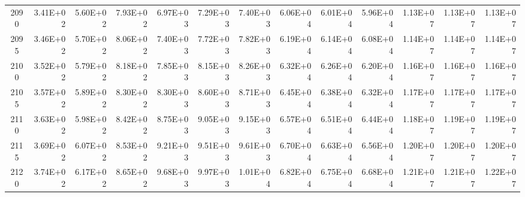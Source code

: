 \documentclass{article}
\begin{document}
\begin{table}
\begin{tabular}{crrr|rrr|rrr|rrr}
2090     & 3.41E+02 & 5.60E+02 & 7.93E+02 & 6.97E+03 & 7.29E+03 & 7.40E+03 & 6.06E+04 & 6.01E+04 & 5.96E+04 & 1.13E+07 & 1.13E+07 & 1.13E+07 \\
2095     & 3.46E+02 & 5.70E+02 & 8.06E+02 & 7.40E+03 & 7.72E+03 & 7.82E+03 & 6.19E+04 & 6.14E+04 & 6.08E+04 & 1.14E+07 & 1.14E+07 & 1.14E+07 \\
2100     & 3.52E+02 & 5.79E+02 & 8.18E+02 & 7.85E+03 & 8.15E+03 & 8.26E+03 & 6.32E+04 & 6.26E+04 & 6.20E+04 & 1.16E+07 & 1.16E+07 & 1.16E+07 \\
2105     & 3.57E+02 & 5.89E+02 & 8.30E+02 & 8.30E+03 & 8.60E+03 & 8.71E+03 & 6.45E+04 & 6.38E+04 & 6.32E+04 & 1.17E+07 & 1.17E+07 & 1.17E+07 \\
2110     & 3.63E+02 & 5.98E+02 & 8.42E+02 & 8.75E+03 & 9.05E+03 & 9.15E+03 & 6.57E+04 & 6.51E+04 & 6.44E+04 & 1.18E+07 & 1.19E+07 & 1.19E+07 \\
2115     & 3.69E+02 & 6.07E+02 & 8.53E+02 & 9.21E+03 & 9.51E+03 & 9.61E+03 & 6.70E+04 & 6.63E+04 & 6.56E+04 & 1.20E+07 & 1.20E+07 & 1.20E+07 \\
2120     & 3.74E+02 & 6.17E+02 & 8.65E+02 & 9.68E+03 & 9.97E+03 & 1.01E+04 & 6.82E+04 & 6.75E+04 & 6.68E+04 & 1.21E+07 & 1.21E+07 & 1.22E+07
\end{tabular}
\end{table}
\end{document}
